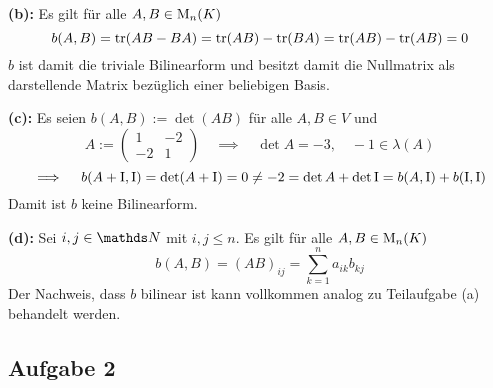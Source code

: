 			\textbf{(b):}
			Es gilt für alle $A,B\in \mathrm{M}_n(K)$
			\[ b(A,B) = \operatorname{tr}(AB-BA) = \operatorname{tr}(AB) - \operatorname{tr}(BA) = \operatorname{tr}(AB) - \operatorname{tr}(AB) = 0 \]
			$b$ ist damit die triviale Bilinearform und besitzt damit die Nullmatrix als darstellende Matrix bezüglich einer beliebigen Basis.

			\textbf{(c):}
			Es seien $b(A,B):=\det(AB)$ für alle $A,B\in V$ und 
			\[
				A:=
				\begin{pmatrix}
					1 & -2 \\ -2 & 1
				\end{pmatrix}
				\quad \implies \quad \det A = -3,\quad -1\in\lambda(A)
			\]
			\[ \implies \quad b(A+\mathrm{I},\mathrm{I}) = \det(A+\mathrm{I}) = 0 \neq -2 = \det A + \det \mathrm{I} = b(A,\mathrm{I}) + b(\mathrm{I},\mathrm{I}) \]
			Damit ist $b$ keine Bilinearform.

			\textbf{(d):}
			Sei $i,j\in\SN$ mit $i,j\leq n$.
			Es gilt für alle $A,B\in \mathrm{M}_n(K)$
			\[ b(A,B) = (AB)_{ij} = \sum_{k=1}^n a_{ik}b_{kj} \]
			Der Nachweis, dass $b$ bilinear ist kann vollkommen analog zu Teilaufgabe (a) behandelt werden.

	
		\subsection*{Aufgabe 2} %
		\label{sub:aufgabe_2}
		
